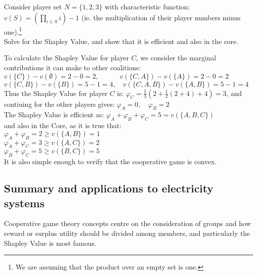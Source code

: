 \begin{example}
Consider player set $N=\{1,2,3\}$ with characteristic function:\\
$v(S)=\left(\prod_{i\in S}i\right)-1$ (ie. the multiplication of their player numbers minus one).\footnote{We are assuming that the product over an empty set is one.}\\
Solve for the Shapley Value, and show that it is efficient and also in the core.
\end{example}

\begin{solution}
To calculate the Shapley Value for player $C$, we consider the marginal contributions it can make to other coalitions:\\
$ v(\{C\})-v(\emptyset) = 2-0 = 2, \quad\quad\quad v(\{C,A\})-v(\{A\}) = 2-0 = 2$\\
$ v(\{C,B\})-v(\{B\}) = 5-1 = 4, \quad v(\{C,A,B\})-v(\{A,B\}) = 5-1 = 4  $\\
Thus the Shapley Value for player $C$ is:
$\varphi_C = \frac{1}{3}\left(2 + \frac{1}{2}(2+4) + 4\right) = 3$, and contiuing for the other players gives:
$\varphi_A = 0,\quad\varphi_B = 2$\\
The Shapley Value is efficient as: $\varphi_A+\varphi_B+\varphi_C = 5 = v(\{A,B,C\})$\\
and also in the Core, as it is true that:\\
$\varphi_A+\varphi_B=2\ge v(\{A,B\})=1$\\
$\varphi_A+\varphi_C=3\ge v(\{A,C\})=2$\\
$\varphi_B+\varphi_C=5\ge v(\{B,C\})=5$\\
It is also simple enough to verify that the cooperative game is convex.

\end{solution}

\subsection{Summary and applications to electricity systems}

Cooperative game theory concepts centre on the consideration of groups and how reward or surplus utility should be divided among members, and particularly the Shapley Value is most famous.

